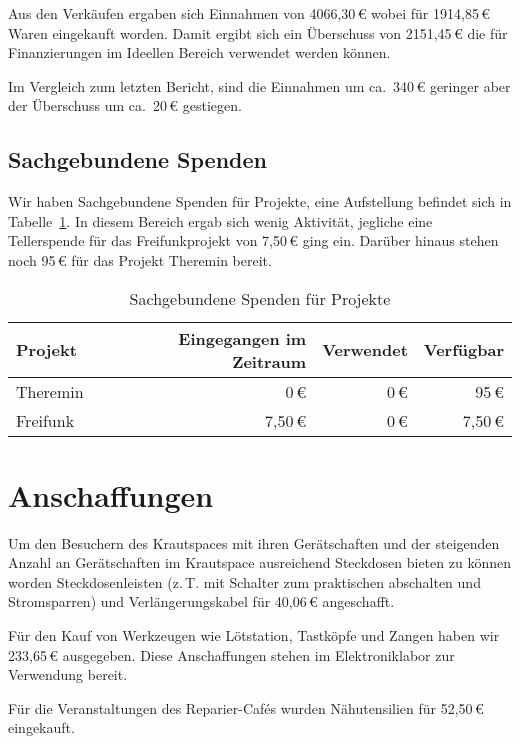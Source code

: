 \documentclass[10pt,DIV16]{scrartcl}
\begin{document}
Aus den Verkäufen ergaben sich Einnahmen von 4066,30\,\euro{} wobei für 1914,85\,\euro{} Waren eingekauft worden.
Damit ergibt sich ein Überschuss von 2151,45\,\euro{} die für Finanzierungen im Ideellen Bereich verwendet werden können.

Im Vergleich zum letzten Bericht, sind die Einnahmen um ca.\ 340\,\euro{} geringer aber der Überschuss um ca.\ 20\,\euro{} gestiegen.

\subsection{Sachgebundene Spenden}
\label{sec:sachegebundene_spenden}
Wir haben Sachgebundene Spenden für Projekte, eine Aufstellung befindet sich in Tabelle~\ref{table:spenden}.
In diesem Bereich ergab sich wenig Aktivität, jegliche eine Tellerspende für das Freifunkprojekt von 7,50\,\euro{} ging ein. Darüber hinaus stehen noch 95\,\euro{} für das Projekt Theremin bereit.

\begin{table}[h]
	\centering
	\begin{tabular}{l|r|r|r}
	\textbf{Projekt} & \textbf{Eingegangen im Zeitraum} & \textbf{Verwendet} & \textbf{Verfügbar} \\ \hline
	Theremin & 0\,\euro{} & 0\,\euro{} & 95\,\euro{} \\
	Freifunk & 7,50\,\euro{} & 0\,\euro{} & 7,50\,\euro{} \\
	\end{tabular}
	\caption{Sachgebundene Spenden für Projekte}
	\label{table:spenden}
\end{table}

\section{Anschaffungen}
\label{sec:anschaffungen}
Um den Besuchern des Krautspaces mit ihren Gerätschaften und der steigenden Anzahl an Gerätschaften im Krautspace ausreichend Steckdosen bieten zu können worden Steckdosenleisten (z.\,T. mit Schalter zum praktischen abschalten und Stromsparren) und Verlängerungskabel für 40,06\,\euro{} angeschafft.

Für den Kauf von Werkzeugen wie Lötstation, Tastköpfe und Zangen haben wir 233,65\,\euro{} ausgegeben.
Diese Anschaffungen stehen im Elektroniklabor zur Verwendung bereit.

Für die Veranstaltungen des Reparier-Cafés wurden Nähutensilien für 52,50\,\euro{} eingekauft.
\end{document}
